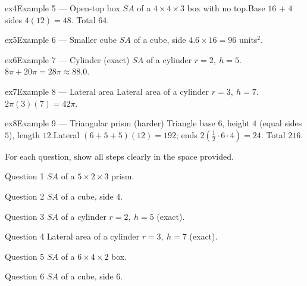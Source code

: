\documentclass[11pt]{article}
\begin{document}
\begin{example}{ex4}{Example 5 --- Open-top box}
$SA$ of a $4\times4\times3$ box with no top.\soln Base $16$ + $4$ sides $4(12)=48$. Total $64$.
\end{example}

\begin{example}{ex5}{Example 6 --- Smaller cube}
$SA$ of a cube, side $4$.\soln $6\times16=96$ units$^2$.
\end{example}

\begin{example}{ex6}{Example 7 --- Cylinder (exact)}
$SA$ of a cylinder $r=2,\ h=5$.\soln $8\pi+20\pi=28\pi\approx88.0$.
\end{example}

\begin{example}{ex7}{Example 8 --- Lateral area}
Lateral area of a cylinder $r=3,\ h=7$.\soln $2\pi(3)(7)=42\pi$.
\end{example}

\begin{example}{ex8}{Example 9 --- Triangular prism (harder)}
Triangle base $6$, height $4$ (equal sides $5$), length $12$.\soln Lateral $(6+5+5)(12)=192$; ends $2(\tfrac12\cdot6\cdot4)=24$. Total $216$.
\end{example}

\clearpage
{}
For each question, show all steps clearly in the space provided.

\begin{qbox}{Question 1}
$SA$ of a $5\times2\times3$ prism.\workspace{2.0cm}
\end{qbox}

\begin{qbox}{Question 2}
$SA$ of a cube, side $4$.\workspace{1.8cm}
\end{qbox}

\begin{qbox}{Question 3}
$SA$ of a cylinder $r=2,\ h=5$ (exact).\workspace{2.2cm}
\end{qbox}

\begin{qbox}{Question 4}
Lateral area of a cylinder $r=3,\ h=7$ (exact).\workspace{2.0cm}
\end{qbox}

\begin{qbox}{Question 5}
$SA$ of a $6\times4\times2$ box.\workspace{2.0cm}
\end{qbox}

\begin{qbox}{Question 6}
$SA$ of a cube, side $6$.\workspace{1.8cm}
\end{qbox}
\end{document}
